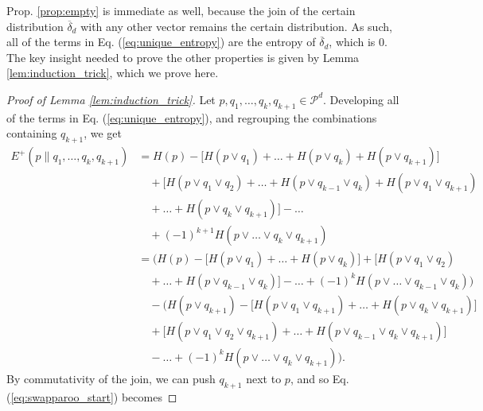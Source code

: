 Prop. \ref{prop:empty} is immediate as well, because the join of the certain distribution $\overline{\delta}_d$ with any other vector remains the certain distribution. As such, all of the terms in Eq. (\ref{eq:unique_entropy}) are the entropy of $\overline{\delta}_d$, which is 0.  The key insight needed to prove the other properties is given by Lemma \ref{lem:induction_trick}, which we prove here.

\begin{proof}[Proof of Lemma \ref{lem:induction_trick}]
    Let $p, q_1, \dots, q_k, q_{k+1} \in \mathcal{P}^d$. Developing all of the terms in Eq. (\ref{eq:unique_entropy}), and regrouping the combinations containing $q_{k+1}$, we get
    \begin{align}
        E^+(p \parallel q_1, \dots, q_k, q_{k+1}) &= H(p) - \Big[H(p \vee q_1) + \dots + H(p \vee q_k) + H(p \vee q_{k+1})\Big] \nonumber \\
                                                  &\quad + \Big[H(p \vee q_1 \vee q_2) + \dots + H(p \vee q_{k-1} \vee q_k) + H(p \vee q_1 \vee q_{k+1}) \nonumber \\
                                                  &\quad + \dots + H(p \vee q_k \vee q_{k+1})\Big] - \dots\nonumber \\
                                                  &\quad + (-1)^{k+1} H(p \vee \dots \vee q_k \vee q_{k+1})\\
                                                  &= \Big(H(p) - \big[H(p \vee q_1) + \dots + H(p \vee q_k)\big] + \big[H(p \vee q_1 \vee q_2)\nonumber \\
                                                  &\quad + \dots + H(p \vee q_{k-1} \vee q_k)\big] - \dots + (-1)^{k} H(p \vee \dots \vee q_{k-1} \vee q_{k})\Big) \nonumber \\
                                                  &\quad - \Big(H(p \vee q_{k+1}) - \big[H(p \vee q_1 \vee q_{k+1}) + \dots + H(p \vee q_k \vee q_{k+1})\big]\nonumber \\
                                                  &\quad + \big[H(p \vee q_1 \vee q_2 \vee q_{k+1}) + \dots + H(p \vee q_{k-1} \vee q_k \vee q_{k+1})\big]\nonumber \\
                                                  &\quad - \dots + (-1)^{k} H(p \vee \dots \vee q_k \vee q_{k+1})\Big). \label{eq:swapparoo_start}
    \end{align}
    By commutativity of the join, we can push $q_{k+1}$ next to $p$, and so Eq. (\ref{eq:swapparoo_start}) becomes

\end{proof}
